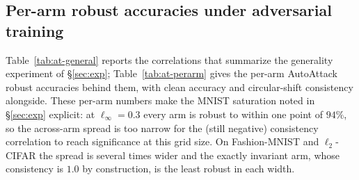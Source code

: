 \documentclass{article}
\theoremstyle{definition}
\begin{document}
\subsection{Per-arm robust accuracies under adversarial training}\label{app:at-tables}
Table~\ref{tab:at-general} reports the correlations that summarize the generality experiment of \S\ref{sec:exp}; Table~\ref{tab:at-perarm} gives the per-arm AutoAttack robust accuracies behind them, with clean accuracy and circular-shift consistency alongside. These per-arm numbers make the MNIST saturation noted in \S\ref{sec:exp} explicit: at $\ell_\infty=0.3$ every arm is robust to within one point of $94\%$, so the across-arm spread is too narrow for the (still negative) consistency correlation to reach significance at this grid size. On Fashion-MNIST and $\ell_2$-CIFAR the spread is several times wider and the exactly invariant arm, whose consistency is $1.0$ by construction, is the least robust in each width.
\end{document}
